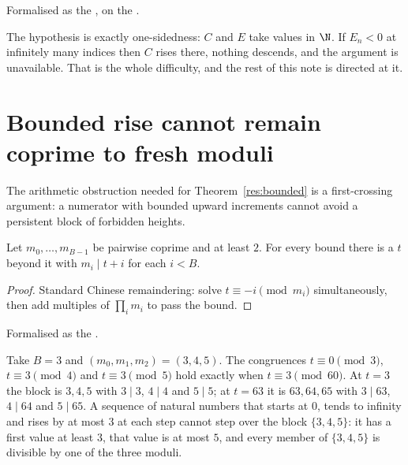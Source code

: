 \documentclass[11pt]{article}
\begin{document}
\noindent Formalised as the
, on the
.

The hypothesis is exactly one-sidedness: $C$ and $E$ take values in $\N$.  If
$E_n<0$ at infinitely many indices then $C$ rises there, nothing descends, and
the argument is unavailable.  That is the whole difficulty, and the rest of
this note is directed at it.

\section{Bounded rise cannot remain coprime to fresh moduli}\label{sec:barrier}

The arithmetic obstruction needed for Theorem~\ref{res:bounded} is a
first-crossing argument: a numerator with bounded upward increments cannot
avoid a persistent block of forbidden heights.

\begin{lemma}\label{res:crt}
Let $m_0,\ldots,m_{B-1}$ be pairwise coprime and at least $2$.  For every bound
there is a $t$ beyond it with $m_i\mid t+i$ for each $i<B$.
\end{lemma}

\begin{proof}
Standard Chinese remaindering: solve $t\equiv-i \pmod{m_i}$ simultaneously,
then add multiples of $\prod_i m_i$ to pass the bound.
\end{proof}

\noindent Formalised as the
.

\begin{example}\label{ex:crt}
Take $B=3$ and $(m_0,m_1,m_2)=(3,4,5)$.  The congruences $t\equiv0\pmod3$,
$t\equiv3\pmod4$ and $t\equiv3\pmod5$ hold exactly when $t\equiv3\pmod{60}$.
At $t=3$ the block is $3,4,5$ with $3\mid3$, $4\mid4$ and $5\mid5$; at $t=63$
it is $63,64,65$ with $3\mid63$, $4\mid64$ and $5\mid65$.  A sequence of
natural numbers that starts at $0$, tends to infinity and rises by at most $3$
at each step cannot step over the block $\{3,4,5\}$: it has a first value at
least $3$, that value is at most $5$, and every member of $\{3,4,5\}$ is
divisible by one of the three moduli.
\end{example}
\end{document}
